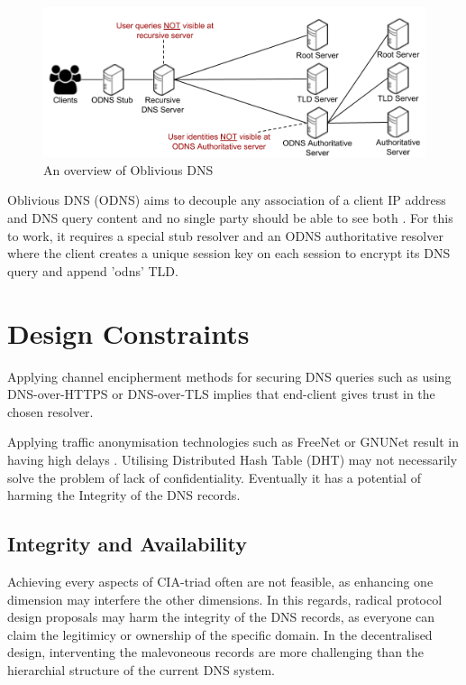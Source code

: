 \documentclass[a4paper,12pt]{article}
\begin{document}
\begin{figure}[h!]
    \begin{center}
    \includegraphics*[width=0.9\columnwidth]{img/ODNSoverview}
    \end{center}
    \caption{An overview of Oblivious DNS \cite{ODNSwebsite}}
    \label{odnsoverview}
\end{figure}
Oblivious DNS (ODNS) aims to decouple any association of a client IP address and DNS query content and no single party should be able to see both \cite{annee-dprive-oblivious-dns-00}. For this to work, it requires a special stub resolver and an ODNS authoritative resolver where the client creates a unique session key on each session to encrypt its DNS query and append 'odns' TLD. 

\newpage

\section{Design Constraints}
Applying channel encipherment methods for securing DNS queries such as using DNS-over-HTTPS or DNS-over-TLS implies that end-client gives trust in the chosen resolver.

Applying traffic anonymisation technologies such as FreeNet\cite{clarke2001freenet} or GNUNet\cite{grothoff2017gnunet} result in having high delays \cite{anonymousoverdns}.
Utilising Distributed Hash Table (DHT) may not necessarily solve the problem of lack of confidentiality. Eventually it has a potential of harming the Integrity of the DNS records.

\subsection{Integrity and Availability}
Achieving every aspects of CIA-triad often are not feasible, as enhancing one dimension may interfere the other dimensions.
In this regards, radical protocol design proposals may harm the integrity of the DNS records, as everyone can claim the legitimicy or ownership of the specific domain.
In the decentralised design, interventing the malevoneous records are more challenging than the hierarchial structure of the current DNS system. 
\newpage
%
\end{document}
